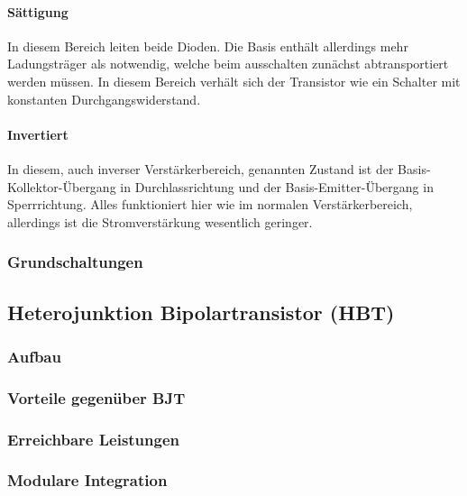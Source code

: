 	\paragraph{Sättigung} In diesem Bereich leiten beide Dioden. Die Basis enthält allerdings mehr Ladungsträger als notwendig, welche beim ausschalten zunächst abtransportiert werden müssen. In diesem Bereich verhält sich der Transistor wie ein Schalter mit konstanten Durchgangswiderstand.
	\paragraph{Invertiert} In diesem, auch inverser Verstärkerbereich, genannten Zustand ist der Basis-Kollektor-Übergang in Durchlassrichtung und der Basis-Emitter-Übergang in Sperrrichtung. Alles funktioniert hier wie im normalen Verstärkerbereich, allerdings ist die Stromverstärkung wesentlich geringer. 
	\subsubsection{Grundschaltungen}
\subsection{Heterojunktion Bipolartransistor (HBT)}
	\subsubsection{Aufbau}
	\subsubsection{Vorteile gegenüber BJT}
	\subsubsection{Erreichbare Leistungen}
	\subsubsection{Modulare Integration}


